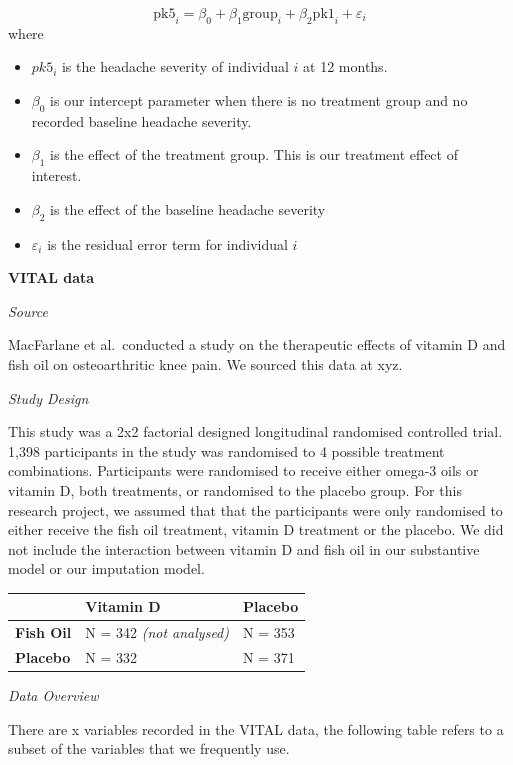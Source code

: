 \documentclass{article}
\providecommand{\tightlist}{%
  \setlength{\itemsep}{0pt}\setlength{\parskip}{0pt}}
\begin{document}
\[\text{pk5}_i = \beta_0 + \beta_1 \text{group}_i + \beta_2 \text{pk1}_i + \varepsilon_i\]
where

\begin{itemize}
\tightlist
\item
  \(pk5_i\) is the headache severity of individual \(i\) at 12 months.
\item
  \(\beta_0\) is our intercept parameter when there is no treatment
  group and no recorded baseline headache severity.
\item
  \(\beta_1\) is the effect of the treatment group. This is our
  treatment effect of interest.
\item
  \(\beta_2\) is the effect of the baseline headache severity
\item
  \(\varepsilon_i\) is the residual error term for individual \(i\)
\end{itemize}

\textbf{VITAL data}

\emph{Source}

MacFarlane et al.~conducted a study on the therapeutic effects of
vitamin D and fish oil on osteoarthritic knee pain. We sourced this data
at xyz.

\emph{Study Design}

This study was a 2x2 factorial designed longitudinal randomised
controlled trial. 1,398 participants in the study was randomised to 4
possible treatment combinations. Participants were randomised to receive
either omega-3 oils or vitamin D, both treatments, or randomised to the
placebo group. For this research project, we assumed that that the
participants were only randomised to either receive the fish oil
treatment, vitamin D treatment or the placebo. We did not include the
interaction between vitamin D and fish oil in our substantive model or
our imputation model.

\begin{longtable}[]{@{}lll@{}}
\toprule\noalign{}
& \textbf{Vitamin D} & \textbf{Placebo} \\
\midrule\noalign{}
\endhead
\bottomrule\noalign{}
\endlastfoot
\textbf{Fish Oil} & N = 342 \emph{(not analysed)} & N = 353 \\
\textbf{Placebo} & N = 332 & N = 371 \\
\end{longtable}

\emph{Data Overview}

There are x variables recorded in the VITAL data, the following table
refers to a subset of the variables that we frequently use.
\end{document}
